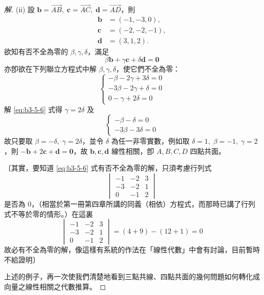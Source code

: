 \begin{proof}[解]
(ii) 設 $\mathbf{b} = \vec{AB},\; \mathbf{c} = \vec{AC},\; \mathbf{d} = \vec{AD}$，則
\begin{align*}
\mathbf{b} &= (-1, -3, 0), \\
\mathbf{c} &= (-2, -2, -1), \\
\mathbf{d} &= (3, 1, 2).
\end{align*}
欲知有否不全為零的 $\beta, \gamma, \delta$，滿足
\begin{equation}
\beta \mathbf{b} + \gamma \mathbf{c} + \delta \mathbf{d} = \mathbf{0} \label{eq:b3-5-5}
\end{equation}
亦卽欲在下列聯立方程式中解 $\beta, \gamma, \delta$，使它們不全為零：
\begin{equation}
\begin{cases}
-\beta - 2\gamma + 3\delta = 0 \\
-3\beta - 2\gamma + \delta = 0 \\
0 - \gamma + 2\delta = 0
\end{cases} \label{eq:b3-5-6}
\end{equation}
解 \eqref{eq:b3-5-6} 式得 $\gamma = 2\delta$ 及
\[ \begin{cases} -\beta - \delta = 0 \\ -3\beta - 3\delta = 0 \end{cases} \]
故只要取 $\beta = -\delta,\; \gamma = 2\delta$，並令 $\delta$ 為任一非零實數，例如取 $\delta = 1,\; \beta = -1,\; \gamma = 2$，則 $-\mathbf{b} + 2\mathbf{c} + \mathbf{d} = \mathbf{0}$，故 $\mathbf{b}, \mathbf{c}, \mathbf{d}$ 線性相關，卽 $A, B, C, D$ 四點共面。

〔其實，要知道 \eqref{eq:b3-5-6} 式有否不全為零的解，只須考慮行列式
\[ \begin{vmatrix} -1 & -2 & 3 \\ -3 & -2 & 1 \\ 0 & -1 & 2 \end{vmatrix} \]
是否為 0，（相當於第一冊第四章所講的同義（相依）方程式，而那時已講了行列式不等於零的情形。）在這裏
\[ \begin{vmatrix} -1 & -2 & 3 \\ -3 & -2 & 1 \\ 0 & -1 & 2 \end{vmatrix} = (4 + 9) - (12 + 1) = 0 \]
故必有不全為零的解，像這樣有系統的作法在「線性代數」中會有討論，目前暫時不給證明〕

上述的例子，再一次使我們清楚地看到三點共線、四點共面的幾何問題如何轉化成向量之線性相關之代數推算。
\end{proof}

